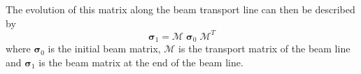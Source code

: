 The evolution of this matrix along the beam transport line can then be described
by
\begin{equation}
	\bm{\sigma}_1 = \mathcal{M}\;\bm{\sigma}_0\;\mathcal{M}^T
	\label{eq:apply}
\end{equation}
where \(\bm{\sigma}_0\) is the initial beam matrix, \(\mathcal{M}\) is the
transport matrix of the beam line and \(\bm{\sigma}_1\) is the beam matrix at
the end of the beam line.

